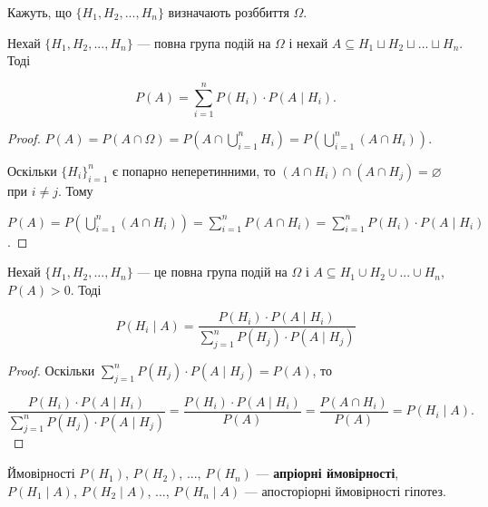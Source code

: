 Кажуть, що $\{H_1, H_2, ..., H_n\}$ визначають розббиття $\Omega$.

\begin{theorem}
    Нехай $\{H_1, H_2, ..., H_n\}$ --- повна група подій на $\Omega$
    і нехай $A \subseteq H_1 \sqcup H_2 \sqcup ... \sqcup H_n$. Тоді
    
    $$P(A)
    = \sum\limits_{i=1}^n P(H_i) \cdot P(A \mid H_i).$$
\end{theorem}
\begin{proof}
    $P(A)
    = P(A \cap \Omega)
    = P(A \cap \bigcup\limits_{i=1}^n H_i)
    = P(\bigcup\limits_{i=1}^n (A \cap H_i)).$

    Оскільки $\{H_i\}_{i=1}^n$ є попарно неперетинними, то 
    $(A \cap H_i) \cap (A \cap H_j) = \varnothing$ при $i \neq j$. Тому

    $P(A)
    = P(\bigcup\limits_{i=1}^n (A \cap H_i))
    = \sum\limits_{i=1}^n P(A \cap H_i)
    = \sum\limits_{i=1}^n P(H_i) \cdot P(A \mid H_i)$.
\end{proof}

\begin{theorem}
    Нехай $\{H_1, H_2, ..., H_n\}$ --- це повна група подій на $\Omega$ і
    $A \subseteq H_1 \cup H_2 \cup ... \cup H_n$, $P(A) > 0$. Тоді

    $$P(H_i \mid A)
    = \frac{P(H_i) \cdot P(A \mid H_i)}{\sum\limits_{j=1}^n P(H_j) \cdot P(A \mid H_j)}$$
\end{theorem}
\begin{proof}
    Оскільки $\sum\limits_{j=1}^n P(H_j) \cdot P(A \mid H_j) = P(A)$, то

    $$\frac{P(H_i) \cdot P(A \mid H_i)}{\sum\limits_{j=1}^n P(H_j) \cdot P(A \mid H_j)}
    = \frac{P(H_i) \cdot P(A \mid H_i)}{P(A)}
    = \frac{P(A \cap H_i)}{P(A)}
    = P(H_i \mid A).$$
\end {proof}

\begin{remark}
    Ймовірності $P(H_1)$, $P(H_2)$, ..., $P(H_n)$ --- \textbf{апріорні ймовірності},
    $P(H_1 \mid A)$, $P(H_2 \mid A)$, ..., $P(H_n \mid A)$ --- апосторіорні
    ймовірності гіпотез.
\end{remark}

